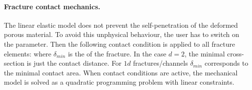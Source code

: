 \paragraph{Fracture contact mechanics.}
The linear elastic model does not prevent the self-penetration of the deformed porous material.
To avoid this unphysical behaviour, the user has to switch on the  parameter.
Then the following contact condition is applied to all fracture elements:
where $\delta_{min}$  is the  of the fracture.
In the case $d=2$, the minimal cross-section is just the contact distance.
For $1d$ fractures/channels $\delta_{min}$ corresponds to the minimal contact area.
When contact conditions are active, the mechanical model is solved as a quadratic programming problem with linear constraints.

